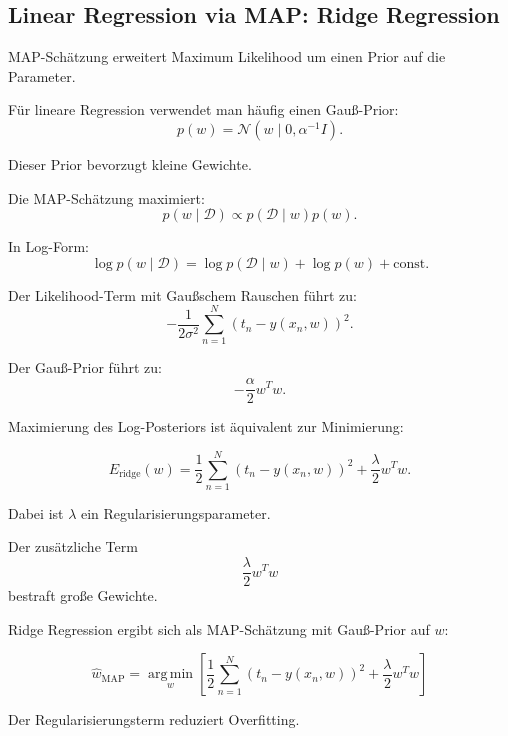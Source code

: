 \documentclass[11pt,a4paper]{scrartcl}
\begin{document}
\subsection{Linear Regression via MAP: Ridge Regression}

\begin{notebox}
    MAP-Schätzung erweitert Maximum Likelihood um einen Prior auf die Parameter.

    Für lineare Regression verwendet man häufig einen Gauß-Prior:
    \[
        p(w)
        =
        \mathcal{N}(w \mid 0,\alpha^{-1}I).
    \]

    Dieser Prior bevorzugt kleine Gewichte.
\end{notebox}

\begin{calculationbox}
    Die MAP-Schätzung maximiert:
    \[
        p(w \mid \mathcal{D})
        \propto
        p(\mathcal{D} \mid w)p(w).
    \]

    In Log-Form:
    \[
        \log p(w \mid \mathcal{D})
        =
        \log p(\mathcal{D} \mid w)
        +
        \log p(w)
        +
        \text{const}.
    \]

    Der Likelihood-Term mit Gaußschem Rauschen führt zu:
    \[
        -\frac{1}{2\sigma^2}
        \sum_{n=1}^{N}
        \left(t_n-y(x_n,w)\right)^2.
    \]

    Der Gauß-Prior führt zu:
    \[
        -\frac{\alpha}{2}
        w^Tw.
    \]
\end{calculationbox}

\begin{calculationbox}
    Maximierung des Log-Posteriors ist äquivalent zur Minimierung:

    \[
        E_{\mathrm{ridge}}(w)
        =
        \frac{1}{2}
        \sum_{n=1}^{N}
        \left(t_n-y(x_n,w)\right)^2
        +
        \frac{\lambda}{2}
        w^Tw.
    \]

    Dabei ist \(\lambda\) ein Regularisierungsparameter.

    Der zusätzliche Term
    \[
        \frac{\lambda}{2}w^Tw
    \]
    bestraft große Gewichte.
\end{calculationbox}

\begin{answerbox}
    Ridge Regression ergibt sich als MAP-Schätzung mit Gauß-Prior auf \(w\):

    \[
        \boxed{
            \hat w_{\mathrm{MAP}}
            =
            \operatorname*{arg\,min}_{w}
            \left[
                \frac{1}{2}
                \sum_{n=1}^{N}
                \left(t_n-y(x_n,w)\right)^2
                +
                \frac{\lambda}{2}
                w^Tw
            \right]
        }
    \]

    Der Regularisierungsterm reduziert Overfitting.
\end{answerbox}
\end{document}
